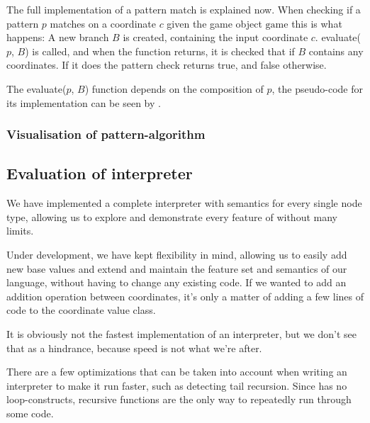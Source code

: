 The full implementation of a pattern match is explained now. When checking if a pattern $p$ matches on a coordinate $c$ given the game object $\text{game}$ this is what happens:
A new branch $B$ is created, containing the input coordinate $c$. 
evaluate($p$, $B$) is called, and when the function returns, it is checked that if $B$ contains any coordinates. If it does the pattern check returns true, and false otherwise.

The evaluate($p$, $B$) function depends on the composition of $p$, the pseudo-code for its implementation can be seen by .



\subsubsection{Visualisation of pattern-algorithm}
\label{sec:vispatternalg}


\subsection{Evaluation of interpreter}
We have implemented a complete interpreter with semantics for every
single node type, allowing us to explore and demonstrate every feature
of \productname{} without many limits.

Under development, we have kept flexibility in mind, allowing us to
easily add new base values and extend and maintain the feature set and
semantics of our language, without having to change any existing code.
If we wanted to add an addition operation between coordinates, it's only
a matter of adding a few lines of code to the coordinate value class.

It is obviously not the fastest implementation of an interpreter, but we
don't see that as a hindrance, because speed is not what we're after.

There are a few optimizations that can be taken into account when
writing an interpreter to make it run faster, such as detecting tail
recursion. Since \productname{} has no loop-constructs, recursive
functions are the only way to repeatedly run through some code.

